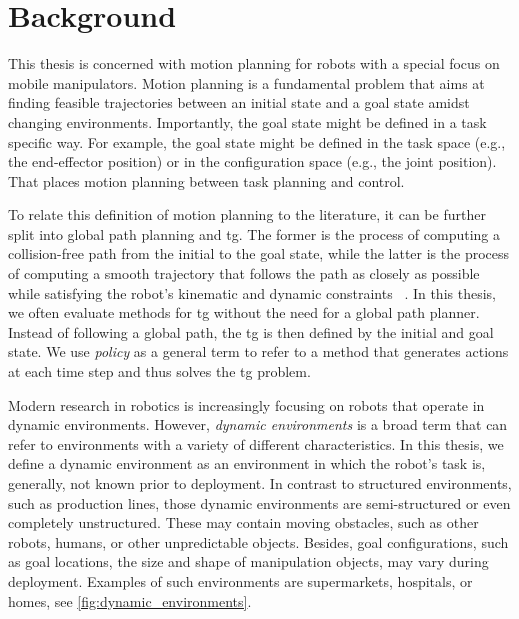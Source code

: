 ﻿\chapter{Background} %
\label{cha:background}

\acresetall

\blfootnote{
  \partscontentfootnote
  \begin{itemize}
    \item \trodynamic
    \item \icraautotuning
    \item \icracoupled
  \end{itemize}
}



\newpage

This thesis is concerned with motion planning for robots
with a special focus on mobile manipulators.
Motion planning is a fundamental problem that
aims at finding feasible trajectories between an initial
state and a goal state amidst changing
environments. Importantly, the goal state might be defined in a
task specific way. For example, the goal state might be
defined in the task space (e.g., the end-effector position)
or in the configuration space (e.g., the joint position).
That places motion planning between task planning and control.

To relate this definition of motion planning to the literature,
it can be further split into global path planning and
\ac{tg}. The former is the process of
computing a collision-free path from the initial to the
goal state, while the latter is the process of computing a
smooth trajectory that follows the path as closely as
possible while satisfying the robot's kinematic and dynamic
constraints ~\cite{Rickert2014}. In this thesis, we often
evaluate methods for \ac{tg} without the need for a global
path planner. Instead of following a global path, the
\ac{tg} is then defined by the initial and goal state.
We use \textit{policy} as a general term to refer to 
a method that generates actions at each time step and thus
solves the \ac{tg} problem.

Modern research in robotics is increasingly focusing on
robots that operate in dynamic environments. However,
\textit{dynamic environments} is a broad term that can refer
to environments with a variety of different characteristics.
In this thesis, we define a dynamic environment as an
environment in which the robot's task is, generally, not
known prior to deployment. In contrast to structured
environments, such as production lines, those dynamic
environments are semi-structured or even completely
unstructured. These may contain moving obstacles, such as
other robots, humans, or other unpredictable objects.
Besides, goal configurations, such as goal locations, the
size and shape of manipulation objects, may vary during
deployment. Examples of such environments are supermarkets,
hospitals, or homes, see \cref{fig:dynamic_environments}.

